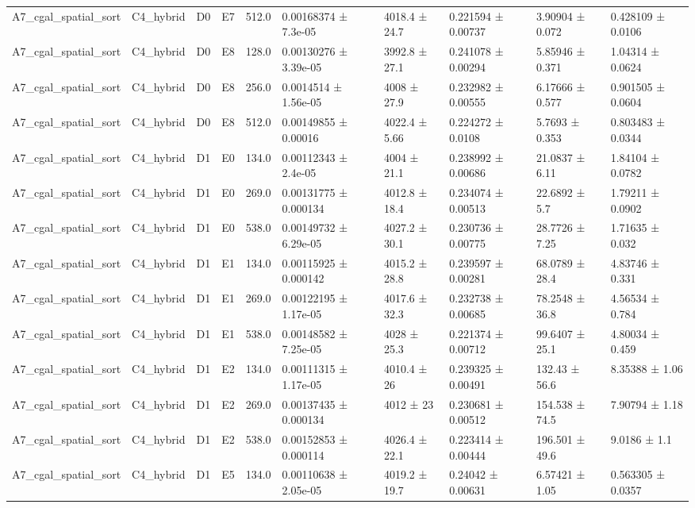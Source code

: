 \begin{table}
\begin{tabular}{llllllllll}
A7\_cgal\_spatial\_sort & C4\_hybrid & D0 & E7 & 512.0 & 0.00168374 ± 7.3e-05 & 4018.4 ± 24.7 & 0.221594 ± 0.00737 & 3.90904 ± 0.072 & 0.428109 ± 0.0106 \\
A7\_cgal\_spatial\_sort & C4\_hybrid & D0 & E8 & 128.0 & 0.00130276 ± 3.39e-05 & 3992.8 ± 27.1 & 0.241078 ± 0.00294 & 5.85946 ± 0.371 & 1.04314 ± 0.0624 \\
A7\_cgal\_spatial\_sort & C4\_hybrid & D0 & E8 & 256.0 & 0.0014514 ± 1.56e-05 & 4008 ± 27.9 & 0.232982 ± 0.00555 & 6.17666 ± 0.577 & 0.901505 ± 0.0604 \\
A7\_cgal\_spatial\_sort & C4\_hybrid & D0 & E8 & 512.0 & 0.00149855 ± 0.00016 & 4022.4 ± 5.66 & 0.224272 ± 0.0108 & 5.7693 ± 0.353 & 0.803483 ± 0.0344 \\
A7\_cgal\_spatial\_sort & C4\_hybrid & D1 & E0 & 134.0 & 0.00112343 ± 2.4e-05 & 4004 ± 21.1 & 0.238992 ± 0.00686 & 21.0837 ± 6.11 & 1.84104 ± 0.0782 \\
A7\_cgal\_spatial\_sort & C4\_hybrid & D1 & E0 & 269.0 & 0.00131775 ± 0.000134 & 4012.8 ± 18.4 & 0.234074 ± 0.00513 & 22.6892 ± 5.7 & 1.79211 ± 0.0902 \\
A7\_cgal\_spatial\_sort & C4\_hybrid & D1 & E0 & 538.0 & 0.00149732 ± 6.29e-05 & 4027.2 ± 30.1 & 0.230736 ± 0.00775 & 28.7726 ± 7.25 & 1.71635 ± 0.032 \\
A7\_cgal\_spatial\_sort & C4\_hybrid & D1 & E1 & 134.0 & 0.00115925 ± 0.000142 & 4015.2 ± 28.8 & 0.239597 ± 0.00281 & 68.0789 ± 28.4 & 4.83746 ± 0.331 \\
A7\_cgal\_spatial\_sort & C4\_hybrid & D1 & E1 & 269.0 & 0.00122195 ± 1.17e-05 & 4017.6 ± 32.3 & 0.232738 ± 0.00685 & 78.2548 ± 36.8 & 4.56534 ± 0.784 \\
A7\_cgal\_spatial\_sort & C4\_hybrid & D1 & E1 & 538.0 & 0.00148582 ± 7.25e-05 & 4028 ± 25.3 & 0.221374 ± 0.00712 & 99.6407 ± 25.1 & 4.80034 ± 0.459 \\
A7\_cgal\_spatial\_sort & C4\_hybrid & D1 & E2 & 134.0 & 0.00111315 ± 1.17e-05 & 4010.4 ± 26 & 0.239325 ± 0.00491 & 132.43 ± 56.6 & 8.35388 ± 1.06 \\
A7\_cgal\_spatial\_sort & C4\_hybrid & D1 & E2 & 269.0 & 0.00137435 ± 0.000134 & 4012 ± 23 & 0.230681 ± 0.00512 & 154.538 ± 74.5 & 7.90794 ± 1.18 \\
A7\_cgal\_spatial\_sort & C4\_hybrid & D1 & E2 & 538.0 & 0.00152853 ± 0.000114 & 4026.4 ± 22.1 & 0.223414 ± 0.00444 & 196.501 ± 49.6 & 9.0186 ± 1.1 \\
A7\_cgal\_spatial\_sort & C4\_hybrid & D1 & E5 & 134.0 & 0.00110638 ± 2.05e-05 & 4019.2 ± 19.7 & 0.24042 ± 0.00631 & 6.57421 ± 1.05 & 0.563305 ± 0.0357 \\

\end{tabular}
\end{table}
